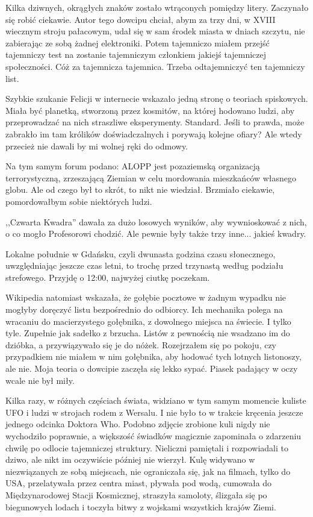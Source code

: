 Kilka dziwnych, okrągłych znaków zostało wtrąconych pomiędzy litery. 
Zaczynało się robić ciekawie. Autor tego dowcipu chciał, abym za trzy dni, w XVIII wiecznym stroju pałacowym,
udał się w sam środek miasta w dniach szczytu, nie zabierając ze sobą żadnej elektroniki.
Potem tajemniczo miałem przejść tajemniczy test na zostanie tajemniczym członkiem jakiejś tajemniczej społeczności. Cóż za tajemnicza tajemnica.
Trzeba odtajemniczyć ten tajemniczy list.

Szybkie szukanie Felicji w internecie wskazało jedną stronę o teoriach spiskowych.
Miała być planetką, stworzoną przez kosmitów, na której hodowano ludzi, aby przeprowadzać na nich straszliwe eksperymenty. Standard.
Jeśli to prawda, może zabrakło im tam królików doświadczalnych i porywają kolejne ofiary?
Ale wtedy przecież nie dawali by mi wolnej ręki do odmowy.

Na tym samym forum podano: ALOPP jest pozaziemską organizacją terrorystyczną, zrzeszającą Ziemian w celu mordowania mieszkańców własnego globu.
Ale od czego był to skrót, to nikt nie wiedział. Brzmiało ciekawie, pomordowałbym sobie niektórych ludzi.

,,Czwarta Kwadra'' dawała za dużo losowych wyników, aby wywnioskować z nich, o co mogło Profesorowi chodzić.
Ale pewnie były także trzy inne... jakieś kwadry.

Lokalne południe w Gdańsku, czyli dwunasta godzina czasu słonecznego, uwzględniając jeszcze czas letni, to trochę przed trzynastą według podziału strefowego.
Przyjdę o 12:00, najwyżej ciutkę poczekam.

Wikipedia natomiast wskazała, że gołębie pocztowe w żadnym wypadku nie mogłyby doręczyć listu bezpośrednio do odbiorcy.
Ich mechanika polega na wracaniu do macierzystego gołębnika, z dowolnego miejsca na świecie. I tylko tyle. Zupełnie jak sadełko z brzucha.
Listów z pewnością nie wsadzano im do dzióbka, a przywiązywało się je do nóżek.
Rozejrzałem się po pokoju, czy przypadkiem nie miałem w nim gołębnika, aby hodować tych lotnych listonoszy, ale nie.
Moja teoria o dowcipie zaczęła się lekko sypać. Piasek padający w oczy wcale nie był miły.

Kilka razy, w różnych częściach świata, widziano w tym samym momencie kuliste UFO i ludzi w strojach rodem z Wersalu. I nie było to w trakcie kręcenia jeszcze jednego odcinka Doktora Who.
Podobno zdjęcie zrobione kuli nigdy nie wychodziło poprawnie, a większość świadków magicznie zapominała o zdarzeniu chwilę po odlocie tajemniczej struktury.
Nieliczni pamiętali i rozpowiadali to dziwo, ale nikt im oczywiście później nie wierzył.
Kulę widywano w niezwiązanych ze sobą miejscach, nie ograniczała się, jak na filmach, tylko do USA, przelatywała przez centra miast, pływała pod wodą, cumowała do Międzynarodowej Stacji Kosmicznej, straszyła samoloty, ślizgała się po biegunowych lodach i toczyła bitwy z wojskami wszystkich krajów Ziemi.

